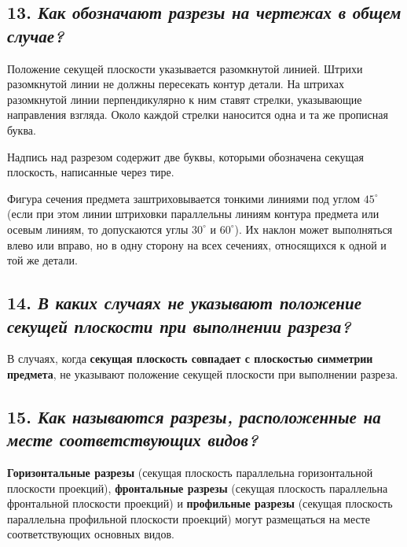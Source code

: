 \subsection*{13. \textit{Как обозначают разрезы на чертежах в общем случае?}}

Положение секущей плоскости указывается разомкнутой линией. Штрихи разомкнутой линии не должны пересекать контур детали. На штрихах разомкнутой линии перпендикулярно к ним ставят стрелки, указывающие направления взгляда. Около каждой стрелки наносится одна и та же прописная буква.




Надпись над разрезом содержит две буквы, которыми обозначена секущая плоскость, написанные через тире.

Фигура сечения предмета заштриховывается тонкими линиями под углом $45^{\circ}$ (если при этом линии штриховки параллельны линиям контура предмета или осевым линиям, то допускаются углы $30^{\circ}$ и $60^{\circ}$). Их наклон может выполняться влево или вправо, но в одну сторону на всех сечениях, относящихся к одной и той же детали.



\subsection*{14. \textit{В каких случаях не указывают положение секущей плоскости при выполнении разреза?}}

В случаях, когда \textbf{секущая плоскость совпадает с плоскостью симметрии предмета}, не указывают положение секущей плоскости при выполнении разреза.
\subsection*{15. \textit{Как называются разрезы, расположенные на месте соответствующих видов?}}

\textbf{Горизонтальные разрезы} (секущая плоскость параллельна горизонтальной плоскости проекций), \textbf{фронтальные разрезы} (секущая плоскость параллельна фронтальной плоскости проекций) и \textbf{профильные разрезы} (секущая плоскость параллельна профильной плоскости проекций) могут размещаться на месте соответствующих основных видов.
